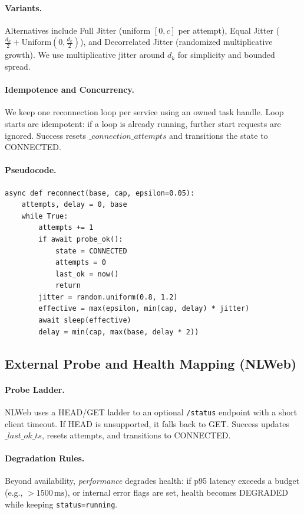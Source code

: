 \documentclass[11pt]{article}
\begin{document}
\paragraph{Variants.} Alternatives include Full Jitter (uniform \([0,c]\) per attempt), Equal Jitter (\(\frac{d_k}{2}+\text{Uniform}(0,\frac{d_k}{2})\)), and Decorrelated Jitter (randomized multiplicative growth). We use multiplicative jitter around \(d_k\) for simplicity and bounded spread.

\paragraph{Idempotence and Concurrency.} We keep one reconnection loop per service using an owned task handle. Loop starts are idempotent: if a loop is already running, further start requests are ignored. Success resets \(\_connection\_attempts\) and transitions the state to CONNECTED.

\paragraph{Pseudocode.}
\begin{verbatim}
async def reconnect(base, cap, epsilon=0.05):
    attempts, delay = 0, base
    while True:
        attempts += 1
        if await probe_ok():
            state = CONNECTED
            attempts = 0
            last_ok = now()
            return
        jitter = random.uniform(0.8, 1.2)
        effective = max(epsilon, min(cap, delay) * jitter)
        await sleep(effective)
        delay = min(cap, max(base, delay * 2))
\end{verbatim}

\subsection{External Probe and Health Mapping (NLWeb)}

\paragraph{Probe Ladder.} NLWeb uses a HEAD/GET ladder to an optional \texttt{/status} endpoint with a short client timeout. If HEAD is unsupported, it falls back to GET. Success updates \(\_last\_ok\_ts\), resets attempts, and transitions to CONNECTED.

\paragraph{Degradation Rules.} Beyond availability, \emph{performance} degrades health: if p95 latency exceeds a budget (e.g., \(>1500\,\mathrm{ms}\)), or internal error flags are set, health becomes DEGRADED while keeping \texttt{status=running}.
\end{document}
